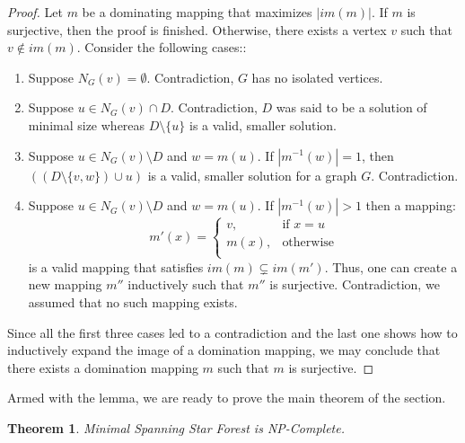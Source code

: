 \documentclass[en]{pracamgr}
\newtheorem{theorem}{Theorem}
\newcommand{\mssfp}{{\sc Minimal Spanning Star Forest}}
\begin{document}
\begin{proof}
	Let $m$ be a dominating mapping that maximizes $|im(m)|$. If $m$ is surjective, then the proof is finished. Otherwise, there exists a vertex $v$ such that $v \notin im(m)$. Consider the following cases::
	\begin{enumerate}
		\item Suppose $N_G(v) = \emptyset$. Contradiction, $G$ has no isolated vertices.
		\item Suppose $u \in N_G(v) \cap D$. Contradiction, $D$ was said to be a solution of minimal size whereas $D \setminus \{u\}$ is a valid, smaller solution.
		\item Suppose $u \in N_{G}(v) \setminus D$ and $w = m(u)$. If $|m^{-1}(w)|=1$, then $((D \setminus \{v,w\}) \cup u)$ is a valid, smaller solution for a graph $G$. Contradiction.
		\item Suppose $u \in N_{G}(v) \setminus D$ and $w = m(u)$. If $|m^{-1}(w)| > 1$ then a mapping:
		\begin{equation*}
			m'(x) = \begin{cases}
			v, & \text{if }x = u \\
			m(x), &\text{otherwise} \\
			\end{cases}
		\end{equation*}
		is a valid mapping that satisfies $im(m) \subsetneq im(m')$. Thus, one can create a new mapping $m''$ inductively such that $m''$ is surjective. Contradiction, we assumed that no such mapping exists. 
	\end{enumerate}
	
	Since all the first three cases led to a contradiction and the last one shows how to inductively expand the image of a domination mapping, we may conclude that there exists a domination mapping $m$ such that $m$ is surjective.  
\end{proof}

Armed with the lemma, we are ready to prove the main theorem of the section.

\begin{theorem}\label{dom ssf}
	\mssfp{} is NP-Complete.
\end{theorem}
\end{document}
